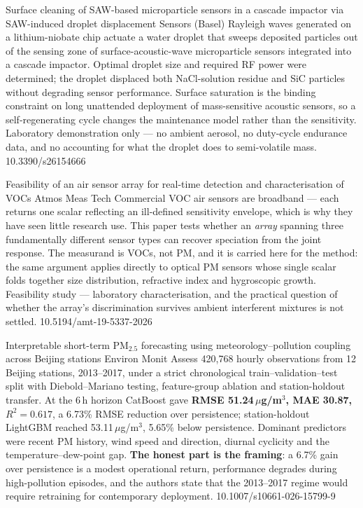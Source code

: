 \documentclass[10pt]{article}
\begin{document}
{Surface cleaning of SAW-based microparticle sensors in a cascade impactor via SAW-induced droplet displacement}
{Sensors (Basel)}
{Rayleigh waves generated on a lithium-niobate chip actuate a water droplet that sweeps
deposited particles out of the sensing zone of surface-acoustic-wave microparticle
sensors integrated into a cascade impactor. Optimal droplet size and required RF power
were determined; the droplet displaced both NaCl-solution residue and SiC particles
without degrading sensor performance. Surface saturation is the binding constraint on
long unattended deployment of mass-sensitive acoustic sensors, so a self-regenerating
cycle changes the maintenance model rather than the sensitivity. Laboratory
demonstration only --- no ambient aerosol, no duty-cycle endurance data, and no accounting
for what the droplet does to semi-volatile mass.}
{10.3390/s26154666}

{Feasibility of an air sensor array for real-time detection and characterisation of VOCs}
{Atmos Meas Tech}
{Commercial VOC air sensors are broadband --- each returns one scalar reflecting an
ill-defined sensitivity envelope, which is why they have seen little research use. This
paper tests whether an \emph{array} spanning three fundamentally different sensor types
can recover speciation from the joint response. The measurand is VOCs, not PM, and it is
carried here for the method: the same argument applies directly to optical PM sensors
whose single scalar folds together size distribution, refractive index and hygroscopic
growth. Feasibility study --- laboratory characterisation, and the practical question of
whether the array's discrimination survives ambient interferent mixtures is not settled.}
{10.5194/amt-19-5337-2026}

{Interpretable short-term PM$_{2.5}$ forecasting using meteorology--pollution coupling across Beijing stations}
{Environ Monit Assess}
{420{,}768 hourly observations from 12 Beijing stations, 2013--2017, under a strict
chronological train--validation--test split with Diebold--Mariano testing, feature-group
ablation and station-holdout transfer. At the 6\,h horizon CatBoost gave
\textbf{RMSE 51.24\,$\mu$g/m$^3$, MAE 30.87, $R^2=0.617$}, a 6.73\% RMSE reduction over
persistence; station-holdout LightGBM reached 53.11\,$\mu$g/m$^3$, 5.65\% below
persistence. Dominant predictors were recent PM history, wind speed and direction,
diurnal cyclicity and the temperature--dew-point gap. \textbf{The honest part is the
framing}: a 6.7\% gain over persistence is a modest operational return, performance
degrades during high-pollution episodes, and the authors state that the 2013--2017 regime
would require retraining for contemporary deployment.}
{10.1007/s10661-026-15799-9}
\end{document}
